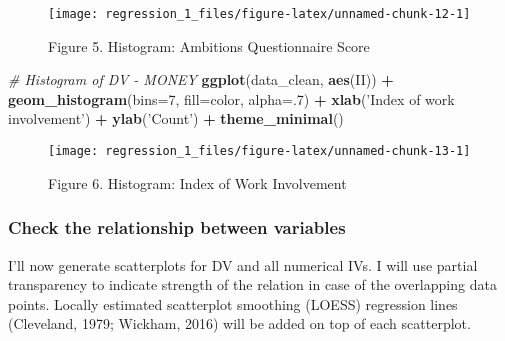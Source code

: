\documentclass[]{article}
\newenvironment{Shaded}{\begin{snugshade}}{\end{snugshade}}
\newcommand{\CommentTok}[1]{\textcolor[rgb]{0.56,0.35,0.01}{\textit{#1}}}
\newcommand{\DataTypeTok}[1]{\textcolor[rgb]{0.13,0.29,0.53}{#1}}
\newcommand{\DecValTok}[1]{\textcolor[rgb]{0.00,0.00,0.81}{#1}}
\newcommand{\KeywordTok}[1]{\textcolor[rgb]{0.13,0.29,0.53}{\textbf{#1}}}
\newcommand{\NormalTok}[1]{#1}
\newcommand{\OperatorTok}[1]{\textcolor[rgb]{0.81,0.36,0.00}{\textbf{#1}}}
\newcommand{\StringTok}[1]{\textcolor[rgb]{0.31,0.60,0.02}{#1}}
\begin{document}
\begin{figure}

{\centering \texttt{[image: regression\_1\_files/figure-latex/unnamed-chunk-12-1]} 

}

\caption{Figure 5. Histogram: Ambitions Questionnaire Score}\label{fig:unnamed-chunk-12}
\end{figure}

\begin{Shaded}
\begin{Highlighting}[]
\CommentTok{# Histogram of DV - MONEY}
\KeywordTok{ggplot}\NormalTok{(data_clean, }\KeywordTok{aes}\NormalTok{(II)) }\OperatorTok{+}\StringTok{ }\KeywordTok{geom_histogram}\NormalTok{(}\DataTypeTok{bins=}\DecValTok{7}\NormalTok{, }\DataTypeTok{fill=}\NormalTok{color, }\DataTypeTok{alpha=}\NormalTok{.}\DecValTok{7}\NormalTok{) }\OperatorTok{+}\StringTok{ }
\StringTok{                           }\KeywordTok{xlab}\NormalTok{(}\StringTok{'Index of work involvement'}\NormalTok{) }\OperatorTok{+}\StringTok{ }
\StringTok{                           }\KeywordTok{ylab}\NormalTok{(}\StringTok{'Count'}\NormalTok{) }\OperatorTok{+}\StringTok{ }
\StringTok{                           }\KeywordTok{theme_minimal}\NormalTok{()}
\end{Highlighting}
\end{Shaded}

\begin{figure}

{\centering \texttt{[image: regression\_1\_files/figure-latex/unnamed-chunk-13-1]} 

}

\caption{Figure 6. Histogram: Index of Work Involvement}\label{fig:unnamed-chunk-13}
\end{figure}

\hypertarget{check-the-relationship-between-variables}{%
\subsubsection{Check the relationship between
variables}\label{check-the-relationship-between-variables}}

I'll now generate scatterplots for DV and all numerical IVs. I will use
partial transparency to indicate strength of the relation in case of the
overlapping data points. Locally estimated scatterplot smoothing (LOESS)
regression lines (Cleveland, 1979; Wickham, 2016) will be added on top
of each scatterplot.
\end{document}
